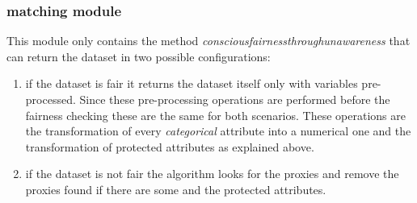 \documentclass[12pt,a4paper,openright,twoside]{book}
\begin{document}
\subsubsection{matching module}
This module only contains the method \emph{conscious\textunderscore fairness\textunderscore through\textunderscore unawareness} that can return the dataset in two possible configurations:
\begin{enumerate}
    \item if the dataset is fair it returns the dataset itself only with variables pre-processed. Since these pre-processing operations are performed before the fairness checking these are the same for both scenarios. These operations are the transformation of every \emph{categorical} attribute into a numerical one and the transformation of protected attributes as explained above.
    \item if the dataset is not fair the algorithm looks for the proxies and remove the proxies found if there are some and the protected attributes.
\end{enumerate}
\end{document}

